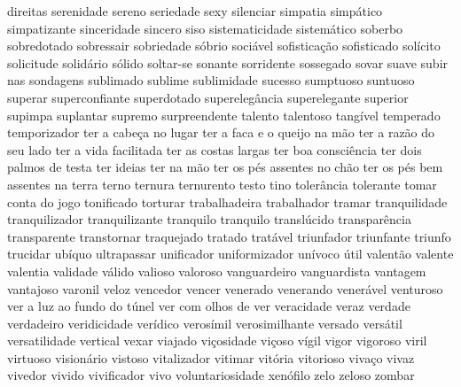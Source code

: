 \begin{appendices}
direitas serenidade sereno seriedade sexy silenciar simpatia simp\'{a}tico simpatizante sinceridade sincero siso sistematicidade sistem\'{a}tico soberbo sobredotado sobressair sobriedade s\'{o}brio soci\'{a}vel sofistica\c{c}\~ao sofisticado sol\'{i}cito solicitude solid\'{a}rio s\'{o}lido soltar-se sonante sorridente sossegado sovar suave subir nas sondagens sublimado sublime sublimidade sucesso sumptuoso suntuoso superar superconfiante superdotado supereleg\^{a}ncia superelegante superior supimpa suplantar supremo surpreendente talento talentoso tang\'{i}vel temperado temporizador ter a cabe\c{c}a no lugar ter a faca e o queijo na m\~ao ter a raz\~ao do seu lado ter a vida facilitada ter as costas largas ter boa consci\^{e}ncia ter dois palmos de testa ter ideias ter na m\~ao ter os p\'{e}s assentes no ch\~ao ter os p\'{e}s bem assentes na terra terno ternura ternurento testo tino toler\^{a}ncia tolerante tomar conta do jogo tonificado torturar trabalhadeira trabalhador tramar tranquilidade tranquilizador tranquilizante tranquilo tranquilo transl\'{u}cido transpar\^{e}ncia transparente transtornar traquejado tratado trat\'{a}vel triunfador triunfante triunfo trucidar ub\'{i}quo ultrapassar unificador uniformizador un\'{i}voco \'{u}til valent\~ao valente valentia validade v\'{a}lido valioso valoroso vanguardeiro vanguardista vantagem vantajoso varonil veloz vencedor vencer venerado venerando vener\'{a}vel venturoso ver a luz ao fundo do t\'{u}nel ver com olhos de ver veracidade veraz verdade verdadeiro veridicidade ver\'{i}dico veros\'{i}mil verosimilhante versado vers\'{a}til versatilidade vertical vexar viajado vi\c{c}osidade vi\c{c}oso v\'{i}gil vigor vigoroso viril virtuoso vision\'{a}rio vistoso vitalizador vitimar vit\'{o}ria vitorioso viva\c{c}o vivaz vivedor vivido vivificador vivo voluntariosidade xen\'{o}filo zelo zeloso zombar 

\end{appendices}